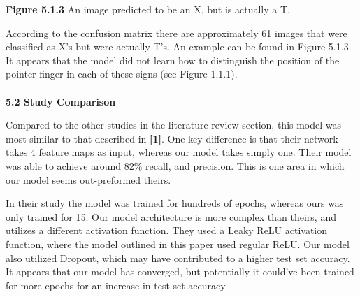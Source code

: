 \documentclass[11pt]{article}
\begin{document}
\begin{multicols}{2}
\begin{center}
\textbf{Figure 5.1.3} An image predicted to be an X, but is actually a T.
\end{center}
\par
According to the confusion matrix there are approximately 61 images that were classified as X's but were actually T's.  An example can be found in Figure 5.1.3.  It appears that the model did not learn how to distinguish the position of the pointer finger in each of these signs (see Figure 1.1.1). \\
\\
\textbf{5.2 Study Comparison}
\par
Compared to the other studies in the literature review section, this model was most similar to that described in \textbf{[1]}.  One key difference is that their network takes 4 feature maps as input, whereas our model takes simply one.  Their model was able to achieve around 82\% recall, and precision.  This is one area in which our model seems out-preformed theirs.  
\par
In their study the model was trained for hundreds of epochs, whereas ours was only trained for 15.  Our model architecture is more complex than theirs, and utilizes a different activation function.  They used a Leaky ReLU activation function, where the model outlined in this paper used regular ReLU.  Our model also utilized Dropout, which may have contributed to a higher test set accuracy.  It appears that our model has converged, but potentially it could've been trained for more epochs for an increase in test set accuracy.

\end{multicols}
\end{document}
